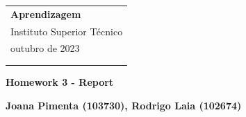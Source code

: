 \documentclass[a4paper,12pt]{article} %
\begin{document}
\thispagestyle{empty} %

\begin{tabular}{p{15.5cm}} %
{\large \bf Aprendizagem} \\
Instituto Superior Técnico \\ outubro  de 2023  \\ \\ 
\hline %
\\
\end{tabular} %

\vspace*{0.3cm} %

\begin{center} %
	{\Large \bf Homework 3 - Report} %
	\vspace{2mm}
	
	{\bf Joana Pimenta (103730), Rodrigo Laia (102674) } %
		
\end{center}  

\vspace{0.4cm}


\end{document}
